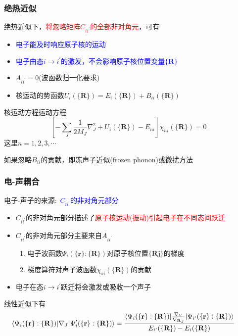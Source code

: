 \frame
{
	\frametitle{绝热近似}
	绝热近似下，\textcolor{red}{将忽略矩阵$C_{ii^{\prime}}$的全部非对角元}，可有
	\begin{itemize}
		\item \textcolor{blue}{电子能及时响应原子核的运动}
		\item \textcolor{blue}{电子由态$i\rightarrow i^{\prime}$的激发，不会影响原子核位置变量${\{\mathbf{R}\}}$}
		\item $A_{ii^{\prime}}=0$(波函数归一化要求)
		\item 核运动的势函数$U_i(\{\mathbf{R}\})=E_i(\{\mathbf{R}\})+B_{ii}(\{\mathbf{R}\})$
	\end{itemize}
	核运动方程运动方程
	\begin{displaymath}
		\left[ -\sum_J\frac1{2M_J}\nabla_J^2+U_i(\{\mathbf{R}\})-E_{ni} \right]\chi_{ni}(\{\mathbf{R}\})=0
	\end{displaymath}
这里$n=1,2,3,\cdots$

如果忽略$B_{ii}$的贡献，即冻声子近似(\textrm{frozen phonon})或微扰方法
}

\frame
{
	\frametitle{电-声耦合}
	电子-声子的来源:~\textcolor{blue}{$C_{ii^{\prime}}$的非对角元部分}
	\begin{itemize}
		\item $C_{ii^{\prime}}$的非对角元部分描述了\textcolor{red}{原子核运动(振动)引起电子在不同态间跃迁}
		\item $C_{ii^{\prime}}$的非对角元部分主要来自$A_{ii^{\prime}}$
			\begin{enumerate}
				\item 电子波函数$\Psi_i(\{\mathbf{r}\}:\{\mathbf{R}\})$对原子核位置$\{\mathbf{Rj}\}$的梯度
				\item 梯度算符对声子波函数$\chi_{si}(\{\mathbf{R}\})$的贡献
			\end{enumerate}
		\item 电子在态$i\rightarrow i^{\prime}$跃迁将会激发或吸收一个声子
	\end{itemize}
	线性近似下有
	\begin{displaymath}
		\hspace*{-15pt}
		\langle\Psi_i(\{\mathbf{r}\}:\{\mathbf{R}\})|\nabla_J|\Psi_i^{\prime}(\{\mathbf{r}\}:\{\mathbf{R}\})\rangle=\frac{\langle\Psi_i(\{\mathbf{r}\}:\{\mathbf{R}\})|\tfrac{\nabla_V}{\nabla_{\mathbf{R}_J}}|\Psi_{i^{\prime}}(\{\mathbf{r}\}:\{\mathbf{R}\})\rangle}{E_{i^{\prime}}(\{\mathbf{R}\})-E_i(\{\mathbf{R}\})}
	\end{displaymath}
}

